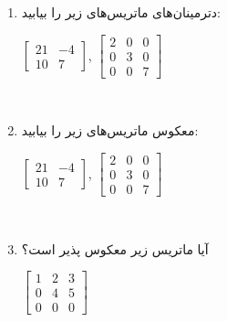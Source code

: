 {\begin{spacing}{1.5}
\begin{enumerate}[label=\textbf{\arabic*}.]
            \item {دترمینان‌های ماتریس‌های زیر را بیابید:
                \begin{center}
                    $\begin{bmatrix}
                         21 & -4 \\
                         10 & 7
                    \end{bmatrix}$,
                    $\begin{bmatrix}
                         2 & 0 & 0 \\
                         0 & 3 & 0 \\
                         0 & 0 & 7
                    \end{bmatrix}$
                \end{center}
            } \\\textbf{\vspace{6pt}}

            \item {معکوس ماتریس‌های زیر را بیابید:
                \begin{center}
                    $\begin{bmatrix}
                         21 & -4 \\
                         10 & 7
                    \end{bmatrix}$,
                    $\begin{bmatrix}
                         2 & 0 & 0 \\
                         0 & 3 & 0 \\
                         0 & 0 & 7
                    \end{bmatrix}$
                \end{center}
            } \\\textbf{\vspace{6pt}}

            \item {آیا ماتریس زیر معکوس پذیر است؟
                \begin{center}
                    $\begin{bmatrix}
                         1 & 2 & 3 \\
                         0 & 4 & 5 \\
                         0 & 0 & 0
                    \end{bmatrix}$
                \end{center}
            } \\\textbf{\vspace{6pt}}


\end{enumerate}
\end{spacing}}
